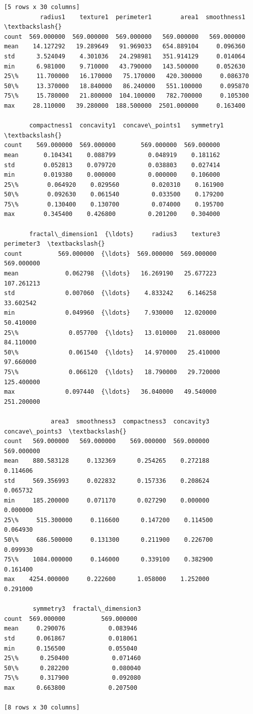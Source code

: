 \documentclass[11pt]{article}
\begin{document}
\begin{Verbatim}[commandchars=\\\{\}]
[5 rows x 30 columns]
          radius1    texture1  perimeter1        area1  smoothness1  \textbackslash{}
count  569.000000  569.000000  569.000000   569.000000   569.000000
mean    14.127292   19.289649   91.969033   654.889104     0.096360
std      3.524049    4.301036   24.298981   351.914129     0.014064
min      6.981000    9.710000   43.790000   143.500000     0.052630
25\%     11.700000   16.170000   75.170000   420.300000     0.086370
50\%     13.370000   18.840000   86.240000   551.100000     0.095870
75\%     15.780000   21.800000  104.100000   782.700000     0.105300
max     28.110000   39.280000  188.500000  2501.000000     0.163400

       compactness1  concavity1  concave\_points1   symmetry1  \textbackslash{}
count    569.000000  569.000000       569.000000  569.000000
mean       0.104341    0.088799         0.048919    0.181162
std        0.052813    0.079720         0.038803    0.027414
min        0.019380    0.000000         0.000000    0.106000
25\%        0.064920    0.029560         0.020310    0.161900
50\%        0.092630    0.061540         0.033500    0.179200
75\%        0.130400    0.130700         0.074000    0.195700
max        0.345400    0.426800         0.201200    0.304000

       fractal\_dimension1  {\ldots}     radius3    texture3  perimeter3  \textbackslash{}
count          569.000000  {\ldots}  569.000000  569.000000  569.000000
mean             0.062798  {\ldots}   16.269190   25.677223  107.261213
std              0.007060  {\ldots}    4.833242    6.146258   33.602542
min              0.049960  {\ldots}    7.930000   12.020000   50.410000
25\%              0.057700  {\ldots}   13.010000   21.080000   84.110000
50\%              0.061540  {\ldots}   14.970000   25.410000   97.660000
75\%              0.066120  {\ldots}   18.790000   29.720000  125.400000
max              0.097440  {\ldots}   36.040000   49.540000  251.200000

             area3  smoothness3  compactness3  concavity3  concave\_points3  \textbackslash{}
count   569.000000   569.000000    569.000000  569.000000       569.000000
mean    880.583128     0.132369      0.254265    0.272188         0.114606
std     569.356993     0.022832      0.157336    0.208624         0.065732
min     185.200000     0.071170      0.027290    0.000000         0.000000
25\%     515.300000     0.116600      0.147200    0.114500         0.064930
50\%     686.500000     0.131300      0.211900    0.226700         0.099930
75\%    1084.000000     0.146000      0.339100    0.382900         0.161400
max    4254.000000     0.222600      1.058000    1.252000         0.291000

        symmetry3  fractal\_dimension3
count  569.000000          569.000000
mean     0.290076            0.083946
std      0.061867            0.018061
min      0.156500            0.055040
25\%      0.250400            0.071460
50\%      0.282200            0.080040
75\%      0.317900            0.092080
max      0.663800            0.207500

[8 rows x 30 columns]
    \end{Verbatim}
\end{document}
